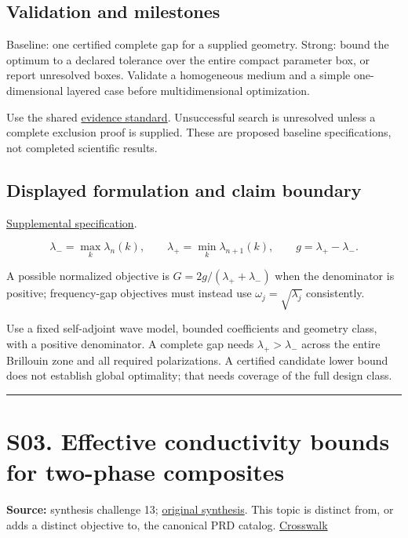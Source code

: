 \documentclass[
  11pt,
]{article}
\begin{document}
\subsection{Validation and milestones}

Baseline: one certified complete gap for a supplied geometry. Strong:
bound the optimum to a declared tolerance over the entire compact
parameter box, or report unresolved boxes. Validate a homogeneous medium
and a simple one-dimensional layered case before multidimensional
optimization.

Use the shared
\href{https://github.com/rick-stevens-ai/Pure-Thought/blob/main/reviews/EVIDENCE-STANDARD.md}{evidence
standard}. Unsuccessful search is unresolved unless a complete exclusion
proof is supplied. These are proposed baseline specifications, not
completed scientific results.

\subsection{Displayed formulation and claim boundary}

\href{https://github.com/rick-stevens-ai/Pure-Thought/blob/main/supplemental/S02.md}{Supplemental
specification}.

\[\lambda_- =\max_k\lambda_n(k),\qquad
\lambda_+=\min_k\lambda_{n+1}(k),\qquad
g=\lambda_+-\lambda_-. \]

A possible normalized objective is \(G=2g/(\lambda_++\lambda_-)\) when
the denominator is positive; frequency-gap objectives must instead use
\(\omega_j=\sqrt{\lambda_j}\) consistently.

Use a fixed self-adjoint wave model, bounded coefficients and geometry
class, with a positive denominator. A complete gap needs
\(\lambda_+>\lambda_-\) across the entire Brillouin zone and all
required polarizations. A certified candidate lower bound does not
establish global optimality; that needs coverage of the full design
class.

\begin{center}\rule{0.5\linewidth}{0.5pt}\end{center}

\section{S03. Effective conductivity bounds for two-phase composites}

\textbf{Source:} synthesis challenge 13;
\href{https://github.com/rick-stevens-ai/Pure-Thought/blob/main/NOTES/30-Most-Compelling-Pure-Thought-AI-Challenges.md}{original
synthesis}. This topic is distinct from, or adds a distinct objective
to, the canonical PRD catalog.
\href{https://github.com/rick-stevens-ai/Pure-Thought/blob/main/reviews/SYNTHESIS-CROSSWALK.md}{Crosswalk}
\end{document}
